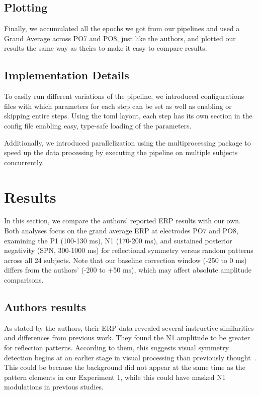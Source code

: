 \documentclass{scrartcl}
\begin{document}
\subsection{Plotting}
Finally, we accumulated all the epochs we got from our pipelines and used a Grand Average across PO7 and PO8, just like the authors, and plotted our results the same way as theirs to make it easy to compare results.

\subsection{Implementation Details}
To easily run different variations of the pipeline, we introduced configurations files with which parameters for each step can be set as well as enabling or skipping entire steps. Using the toml layout, each step has its own section in the config file enabling easy, type-safe loading of the parameters.

Additionally, we introduced parallelization using the multiprocessing package to speed up the data processing by executing the pipeline on multiple subjects concurrently.


\section{Results}
In this section, we compare the authors' reported ERP results with our own. Both analyses focus on the grand average ERP at electrodes PO7 and PO8, examining the P1 (100-130 ms), N1 (170-200 ms), and sustained posterior negativity (SPN, 300-1000 ms) for reflectional symmetry versus random patterns across all 24 subjects. Note that our baseline correction window (-250 to 0 ms) differs from the authors' (-200 to +50 ms), which may affect absolute amplitude comparisons.

\subsection{Authors results}
As stated by the authors, their ERP data revealed several instructive similarities and differences from previous work. 
They found the N1 amplitude to be greater for reflection patterns.
According to them, this suggests visual symmetry detection begins at an earlier stage in visual processing than previously thought~\cite{humansymetry}.
This could be because the background did not appear at the same time as the pattern elements in our Experiment 1, while this could
have masked N1 modulations in previous studies. 
\end{document}
